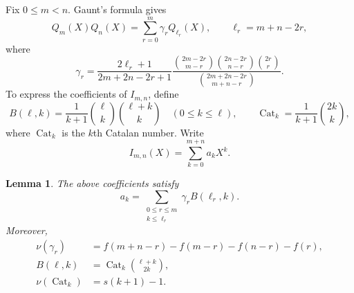 \documentclass[11pt,a4paper]{article}
\numberwithin{equation}{section}
\newtheorem{lemma}[theorem]{Lemma}
\theoremstyle{definition}
\begin{document}
Fix $0\le m<n$. Gaunt's formula
\cite[Eqs.~(34.3.5) and (34.3.19)]{DLMF} gives
\begin{equation}
 Q_m(X)Q_n(X)=\sum_{r=0}^m\gamma_rQ_{\ell_r}(X),
 \qquad\ell_r=m+n-2r,
 \label{eq:2-11}
\end{equation}
where
\begin{equation}
 \gamma_r=
 \frac{2\ell_r+1}{2m+2n-2r+1}
 \frac{\displaystyle
 \binom{2m-2r}{m-r}\binom{2n-2r}{n-r}\binom{2r}{r}}
 {\displaystyle\binom{2m+2n-2r}{m+n-r}}.
 \label{eq:2-12}
\end{equation}
To express the coefficients of $I_{m,n}$, define
\begin{equation}
 B(\ell,k)=\frac{1}{k+1}\binom{\ell}{k}\binom{\ell+k}{k}
 \quad(0\le k\le\ell),\qquad
 \operatorname{Cat}_k=\frac{1}{k+1}\binom{2k}{k},
 \label{eq:2-13}
\end{equation}
where $\operatorname{Cat}_k$ is the $k$th Catalan number. Write
\begin{equation}
 I_{m,n}(X)=\sum_{k=0}^{m+n}a_kX^k.
 \label{eq:2-14}
\end{equation}

\begin{lemma}\label{lem:2-5}
The above coefficients satisfy
\begin{equation}
 a_k=\sum_{\substack{0\le r\le m\\k\le\ell_r}}
 \gamma_rB(\ell_r,k).
 \label{eq:2-15}
\end{equation}
Moreover,
\begin{align}
 \nu(\gamma_r)
 &=f(m+n-r)-f(m-r)-f(n-r)-f(r),
 \label{eq:2-16}\\
 B(\ell,k)&=\operatorname{Cat}_k\binom{\ell+k}{2k},
 \label{eq:2-17}\\
 \nu(\operatorname{Cat}_k)&=s(k+1)-1.
 \label{eq:2-18}
\end{align}
\end{lemma}
\end{document}
